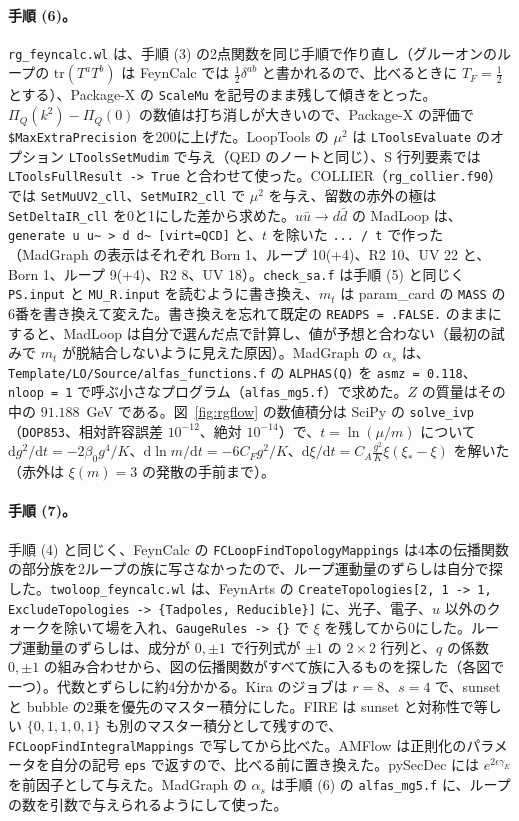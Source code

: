 \documentclass[a4paper,10pt]{ltjsarticle}
\newcommand{\dd}{\mathrm{d}}
\begin{document}
\paragraph{手順 (6)。}\texttt{rg\_feyncalc.wl} は、手順 (3) の2点関数を同じ手順で作り直し（グルーオンのループの $\mathrm{tr}(T^aT^b)$ は FeynCalc では $\frac12\delta^{ab}$ と書かれるので、比べるときに $T_F=\frac12$ とする）、Package-X の \texttt{ScaleMu} を記号のまま残して傾きをとった。$\Pi_Q(k^2)-\Pi_Q(0)$ の数値は打ち消しが大きいので、Package-X の評価で \texttt{\$MaxExtraPrecision} を200に上げた。LoopTools の $\mu^2$ は \texttt{LToolsEvaluate} のオプション \texttt{LToolsSetMudim} で与え（QED のノートと同じ）、S 行列要素では \texttt{LToolsFullResult -> True} と合わせて使った。COLLIER（\texttt{rg\_collier.f90}）では \texttt{SetMuUV2\_cll}、\texttt{SetMuIR2\_cll} で $\mu^2$ を与え、留数の赤外の極は \texttt{SetDeltaIR\_cll} を0と1にした差から求めた。$u\bar u\to d\bar d$ の MadLoop は、\texttt{generate u u\textasciitilde{} > d d\textasciitilde{} [virt=QCD]} と、$t$ を除いた \texttt{... / t} で作った（MadGraph の表示はそれぞれ Born 1、ループ 10(+4)、R2 10、UV 22 と、Born 1、ループ 9(+4)、R2 8、UV 18）。\texttt{check\_sa.f} は手順 (5) と同じく \texttt{PS.input} と \texttt{MU\_R.input} を読むように書き換え、$m_t$ は param\_card の \texttt{MASS} の6番を書き換えて変えた。書き換えを忘れて既定の \texttt{READPS = .FALSE.} のままにすると、MadLoop は自分で選んだ点で計算し、値が予想と合わない（最初の試みで $m_t$ が脱結合しないように見えた原因）。MadGraph の $\alpha_s$ は、\texttt{Template/LO/Source/alfas\_functions.f} の \texttt{ALPHAS(Q)} を \texttt{asmz = 0.118}、\texttt{nloop = 1} で呼ぶ小さなプログラム（\texttt{alfas\_mg5.f}）で求めた。$Z$ の質量はその中の $91.188$~GeV である。図~\ref{fig:rgflow} の数値積分は SciPy の \texttt{solve\_ivp}（\texttt{DOP853}、相対許容誤差 $10^{-12}$、絶対 $10^{-14}$）で、$t=\ln(\mu/m)$ について $\dd g^2/\dd t=-2\beta_0g^4/K$、$\dd\ln m/\dd t=-6C_Fg^2/K$、$\dd\xi/\dd t=C_A\frac{g^2}K\xi(\xi_*-\xi)$ を解いた（赤外は $\xi(m)=3$ の発散の手前まで）。

\paragraph{手順 (7)。}手順 (4) と同じく、FeynCalc の \texttt{FCLoopFindTopologyMappings} は4本の伝播関数の部分族を2ループの族に写さなかったので、ループ運動量のずらしは自分で探した。\texttt{twoloop\_feyncalc.wl} は、FeynArts の \texttt{CreateTopologies[2, 1 -> 1, ExcludeTopologies -> \{Tadpoles, Reducible\}]} に、光子、電子、$u$ 以外のクォークを除いて場を入れ、\texttt{GaugeRules -> \{\}} で $\xi$ を残してから0にした。ループ運動量のずらしは、成分が $0,\pm1$ で行列式が $\pm1$ の $2\times2$ 行列と、$q$ の係数 $0,\pm1$ の組み合わせから、図の伝播関数がすべて族に入るものを探した（各図で一つ）。代数とずらしに約4分かかる。Kira のジョブは $r=8$、$s=4$ で、sunset と bubble の2乗を優先のマスター積分にした。FIRE は sunset と対称性で等しい $\{0,1,1,0,1\}$ も別のマスター積分として残すので、\texttt{FCLoopFindIntegralMappings} で写してから比べた。AMFlow は正則化のパラメータを自分の記号 \texttt{eps} で返すので、比べる前に置き換えた。pySecDec には $e^{2\epsilon\gamma_E}$ を前因子として与えた。MadGraph の $\alpha_s$ は手順 (6) の \texttt{alfas\_mg5.f} に、ループの数を引数で与えられるようにして使った。
\end{document}
